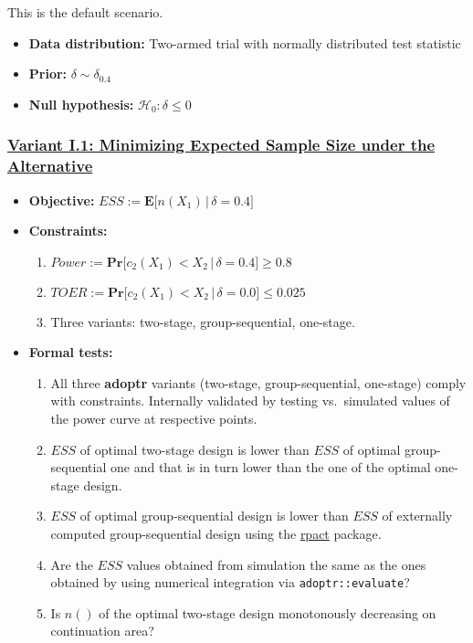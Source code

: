 \documentclass[]{book}
\providecommand{\tightlist}{%
  \setlength{\itemsep}{0pt}\setlength{\parskip}{0pt}}
\begin{document}
This is the default scenario.

\begin{itemize}
\tightlist
\item
  \textbf{Data distribution:} Two-armed trial with normally distributed test statistic
\item
  \textbf{Prior:} \(\delta\sim\delta_{0.4}\)
\item
  \textbf{Null hypothesis:} \(\mathcal{H}_0:\delta \leq 0\)
\end{itemize}

\hypertarget{variant-i.1-minimizing-expected-sample-size-under-the-alternative}{%
\subsubsection{\texorpdfstring{\protect\hyperlink{variantI_1}{Variant I.1: Minimizing Expected Sample Size under the Alternative}}{Variant I.1: Minimizing Expected Sample Size under the Alternative}}\label{variant-i.1-minimizing-expected-sample-size-under-the-alternative}}

\begin{itemize}
\tightlist
\item
  \textbf{Objective:} \(ESS := \boldsymbol{E}\big[n(X_1)\,|\,\delta=0.4\big]\)
\item
  \textbf{Constraints:}

  \begin{enumerate}
  \def\labelenumi{\arabic{enumi}.}
  \tightlist
  \item
    \(Power := \boldsymbol{Pr}\big[c_2(X_1) < X_2\,|\,\delta=0.4\big] \geq 0.8\)
  \item
    \(TOER := \boldsymbol{Pr}\big[c_2(X_1) < X_2\,|\,\delta=0.0\big] \leq 0.025\)
  \item
    Three variants: two-stage, group-sequential, one-stage.
  \end{enumerate}
\item
  \textbf{Formal tests:}

  \begin{enumerate}
  \def\labelenumi{\arabic{enumi}.}
  \tightlist
  \item
    All three \textbf{adoptr} variants (two-stage, group-sequential, one-stage)
    comply with constraints. Internally validated by testing vs.~simulated
    values of the power curve at respective points.
  \item
    \(ESS\) of optimal two-stage design is lower than \(ESS\) of optimal
    group-sequential one and that is in turn lower than the one of the
    optimal one-stage design.
  \item
    \(ESS\) of optimal group-sequential design is lower than \(ESS\) of
    externally computed group-sequential design using the \href{https://rpact.org/}{rpact} package.
  \item
    Are the \(ESS\) values obtained from simulation the same as the ones
    obtained by using numerical integration via \texttt{adoptr::evaluate}?
  \item
    Is \(n()\) of the optimal two-stage design monotonously decreasing on
    continuation area?
  \end{enumerate}
\end{itemize}
\end{document}

